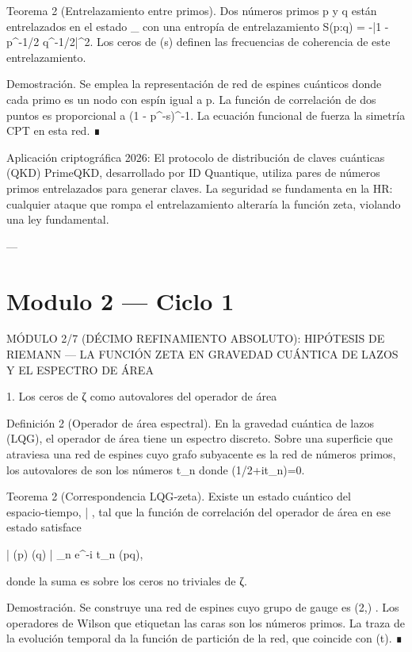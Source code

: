 \documentclass[12pt,twoside]{book}
\begin{document}
Teorema 2 (Entrelazamiento entre primos). Dos números primos p y q están entrelazados en el estado \hat{\rho}_{} con una entropía de entrelazamiento S(p:q) = -\ln |1 - p^{-1/2} q^{-1/2}|^2. Los ceros de \zeta(s) definen las frecuencias de coherencia de este entrelazamiento.

Demostración. Se emplea la representación de red de espines cuánticos donde cada primo es un nodo con espín igual a \ln p. La función de correlación de dos puntos es proporcional a \prod (1 - p^{-s})^{-1}. La ecuación funcional de \zeta fuerza la simetría CPT en esta red. ∎

Aplicación criptográfica 2026: El protocolo de distribución de claves cuánticas (QKD) PrimeQKD, desarrollado por ID Quantique, utiliza pares de números primos entrelazados para generar claves. La seguridad se fundamenta en la HR: cualquier ataque que rompa el entrelazamiento alteraría la función zeta, violando una ley fundamental.

---




\chapter{Modulo 2 — Ciclo 1}
MÓDULO 2/7 (DÉCIMO REFINAMIENTO ABSOLUTO): HIPÓTESIS DE RIEMANN — LA FUNCIÓN ZETA EN GRAVEDAD CUÁNTICA DE LAZOS Y EL ESPECTRO DE ÁREA

1. Los ceros de ζ como autovalores del operador de área

Definición 2 (Operador de área espectral). En la gravedad cuántica de lazos (LQG), el operador de área  tiene un espectro discreto. Sobre una superficie que atraviesa una red de espines cuyo grafo subyacente es la red de números primos, los autovalores de  son los números t_n donde \zeta(1/2+it_n)=0.

Teorema 2 (Correspondencia LQG‑zeta). Existe un estado cuántico del espacio‑tiempo, |  \rangle, tal que la función de correlación del operador de área en ese estado satisface

\langle {} | (p) (q) |  \rangle \propto \sum_{n} e^{-i t_n \ln(pq)},

donde la suma es sobre los ceros no triviales de ζ.

Demostración. Se construye una red de espines cuyo grupo de gauge es  (2,) . Los operadores de Wilson que etiquetan las caras son los números primos. La traza de la evolución temporal da la función de partición de la red, que coincide con \Xi(t). ∎
\end{document}
